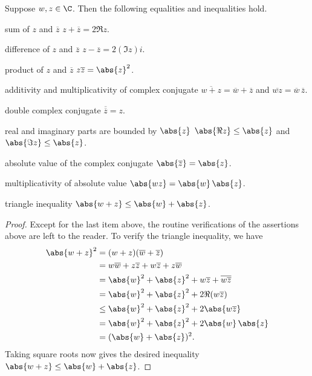 \begin{result}\label{ax:4.4}
Suppose $w,z\in\C$. Then the following equalities and inequalities hold.
\begin{axprops}
\item[sum of $z$ and $\overline{z}$] $z+\overline{z}=2\Re z$.
\item[difference of $z$ and $\overline{z}$] $z-\overline{z}=2(\Im z)i$.
\item[product of $z$ and $\overline{z}$] $z\overline{z}=\abs{z}^2$.
\item[additivity and multiplicativity of complex conjugate]
  $\overline{w+z}=\overline{w}+\overline{z}$ and
  $\overline{wz}=\overline{w}\,\overline{z}$.
\item[double complex conjugate] $\overline{\overline{z}}=z$.
\item[real and imaginary parts are bounded by $\abs{z}$]
  $\abs{\Re z}\le\abs{z}$ and $\abs{\Im z}\le\abs{z}$.
\item[absolute value of the complex conjugate]
  $\abs{\overline{z}}=\abs{z}$.
\item[multiplicativity of absolute value] $\abs{wz}=\abs{w}\,\abs{z}$.
\item[triangle inequality] $\abs{w+z}\le\abs{w}+\abs{z}$.
\end{axprops}
\end{result}

\begin{proof}
%
Except for the last item above, the routine verifications of the assertions
above are left to the reader. To verify the triangle inequality, we have
\begin{align*}
\abs{w+z}^2 &= (w+z)(\overline{w}+\overline{z})\\
  &= w\overline{w}+z\overline{z}+w\overline{z}+z\overline{w}\\
  &= \abs{w}^2+\abs{z}^2+w\overline{z}+\overline{w\overline{z}}\\
  &= \abs{w}^2+\abs{z}^2+2\Re(w\overline{z})\\
  &\le \abs{w}^2+\abs{z}^2+2\abs{w\overline{z}}\\
  &= \abs{w}^2+\abs{z}^2+2\abs{w}\,\abs{z}\\
  &= (\abs{w}+\abs{z})^2.
\end{align*}
Taking square roots now gives the desired inequality
$\abs{w+z}\le\abs{w}+\abs{z}$.
\end{proof}

